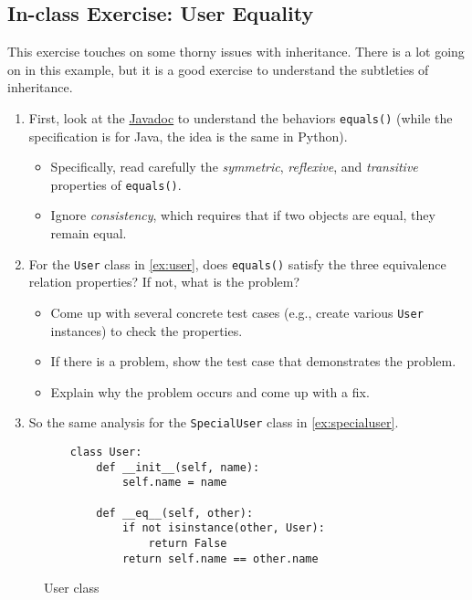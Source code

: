 \documentclass[oneside,11pt,dvipsnames]{book}
\newcommand{\code}[1]{\texttt{#1}}
\begin{document}
\subsection{In-class Exercise: User Equality}
This exercise touches on some thorny issues with inheritance. There is a lot going on in this example, but it is a good exercise to understand the subtleties of inheritance. 

\begin{enumerate}
    \item First, look at the \href{https://docs.oracle.com/javase/8/docs/api/java/lang/Object.html#equals-java.lang.Object-}{Javadoc} to understand the behaviors \code{equals()} (while the specification is for Java, the idea is the same in Python).
    \begin{itemize}
        \item Specifically, read carefully the \emph{symmetric}, \emph{reflexive}, and \emph{transitive} properties of \code{equals()}.
        \item Ignore \emph{consistency}, which requires that if two objects are equal, they remain equal.
    \end{itemize}    
    \item For the \code{User} class in \autoref{ex:user}, does \code{equals()} satisfy the three equivalence relation properties? If not, what is the problem?
    \begin{itemize}
        \item Come up with several concrete test cases (e.g., create various \code{User} instances) to check the properties.
        \item If there is a problem, show the test case that demonstrates the problem.
        \item Explain why the problem occurs and come up with a fix.
    \end{itemize}
    \item So the same analysis for the \code{SpecialUser} class in \autoref{ex:specialuser}.
    \end{enumerate}
    
    

\begin{figure}
\begin{lstlisting}
    class User:
        def __init__(self, name):
            self.name = name

        def __eq__(self, other):
            if not isinstance(other, User):
                return False
            return self.name == other.name
\end{lstlisting}
\caption{User class}\label{ex:user}
\end{figure}
\end{document}
